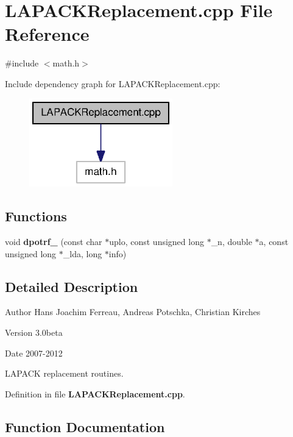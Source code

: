 \section{LAPACKReplacement.cpp File Reference}
\label{LAPACKReplacement_8cpp}
{\ttfamily \#include $<$math.h$>$}\par
Include dependency graph for LAPACKReplacement.cpp:
\nopagebreak
\begin{figure}[H]
\begin{center}
\leavevmode
\includegraphics[width=176pt]{LAPACKReplacement_8cpp__incl}
\end{center}
\end{figure}
\subsection*{Functions}
\begin{DoxyCompactItemize}
\item 
void {\bf dpotrf\_\-} (const char $\ast$uplo, const unsigned long $\ast$\_\-n, double $\ast$a, const unsigned long $\ast$\_\-lda, long $\ast$info)
\end{DoxyCompactItemize}


\subsection{Detailed Description}
\begin{DoxyAuthor}{Author}
Hans Joachim Ferreau, Andreas Potschka, Christian Kirches 
\end{DoxyAuthor}
\begin{DoxyVersion}{Version}
3.0beta 
\end{DoxyVersion}
\begin{DoxyDate}{Date}
2007-\/2012
\end{DoxyDate}
LAPACK replacement routines. 

Definition in file {\bf LAPACKReplacement.cpp}.



\subsection{Function Documentation}
